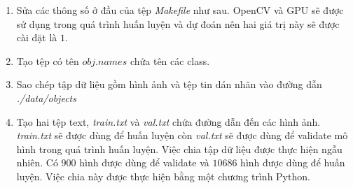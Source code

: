 \begin{enumerate}
	\item Sửa các thông số ở đầu của tệp \emph{Makefile} như sau. OpenCV và GPU sẽ được sử dụng trong quá trình huấn luyện và dự đoán nên hai giá trị này sẽ được cài đặt là $1$.

\noindent{}

	\item Tạo tệp có tên $obj.names$ chứa tên các class.

\noindent{}

	\item Sao chép tập dữ liệu gồm hình ảnh và tệp tin dán nhãn vào đường dẫn \emph{./data/objects}

	\item Tạo hai tệp text, \emph{train.txt} và \emph{val.txt} chứa đường dẫn đến các hình ảnh. \emph{train.txt} sẽ được dùng để huấn luyện còn \emph{val.txt} sẽ được dùng để validate mô hình trong quá trình huấn luyện. Việc chia tập dữ liệu được thực hiện ngẫu nhiên. Có $900$ hình được dùng để validate và $10686$ hình được dùng để huấn luyện. Việc chia này được thực hiện bằng một chương trình Python.

\noindent{}
\end{enumerate}
